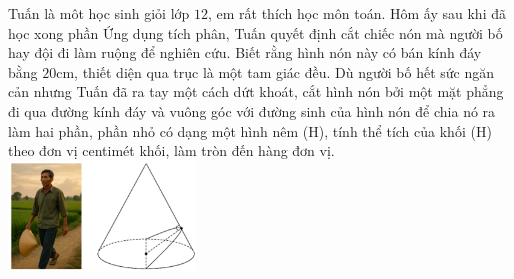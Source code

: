 \begin{ex}%
\immini
{
    Tuấn là môt học sinh giỏi lớp $12$, em rất thích học môn toán. Hôm ấy sau khi đã học xong phần Ứng dụng tích phân, Tuấn quyết định cắt chiếc nón mà người bố hay đội đi làm ruộng để nghiên cứu. Biết rằng hình nón này có bán kính đáy bằng $20$cm, thiết diện qua trục là một tam giác đều. Dù người bố hết sức ngăn cản nhưng Tuấn đã ra tay một cách dứt khoát, cắt hình nón bởi một mặt phẳng đi qua đường kính đáy và vuông góc với đường sinh của hình nón để chia nó ra làm hai phần, phần nhỏ có dạng một hình nêm (H), tính thể tích của khối (H) theo đơn vị centimét khối, làm tròn đến hàng đơn vị.
}
{
    \includegraphics[width=5cm]{img/HXN-10-20}
}
\end{ex}

